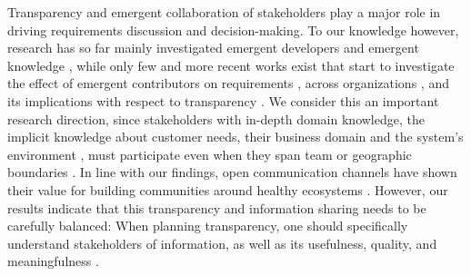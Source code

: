 Transparency and emergent collaboration of stakeholders play a major role in driving requirements discussion and decision-making.
To our knowledge however, research has so far mainly investigated emergent developers \cite{Minto2007,Haenni2014,Sadi2015} and emergent knowledge \cite{Treude2012}, while only few and more recent works exist that start to investigate the effect of emergent contributors on requirements \cite{Kwan2011}, across organizations \cite{Linaker2016,KYB+2016}, and its implications with respect to transparency \cite{Dabbish2013,Hosseini2016}. 
We consider this an important research direction, since stakeholders with in-depth domain knowledge, the implicit knowledge about customer needs, their business domain and the system’s environment \cite{Damian2013}, must participate even when they span team or geographic boundaries \cite{boden2009bridging}.
In line with our findings, open communication channels have shown their value for building communities around healthy ecosystems  \cite{Kilamo2012}.
However, our results indicate that this transparency and information sharing needs to be carefully balanced: When planning transparency, one should specifically understand stakeholders  of information, as well as its usefulness, quality, and meaningfulness \cite{Hosseini2016}.